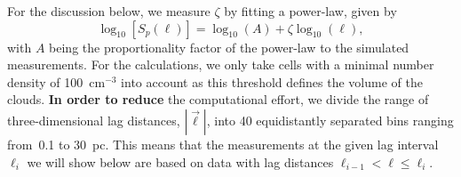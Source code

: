 For the discussion below, we measure $\zeta$ by fitting a power-law, given by
\begin{equation}
	\log_{10}\left[ S_p(\ell) \right] = \log_{10}\left(A\right) + \zeta \log_{10}(\ell) ,
    \label{equ:method:fitting}
\end{equation}
with $A$ being the proportionality factor of the power-law to the simulated measurements.
For the calculations, we only take cells with a minimal number density of 100~cm$^{-3}$ into account as this threshold defines the volume of the clouds.
\textbf{In order to reduce} the computational effort, we divide the range of three-dimensional lag distances, $|\vec{\ell}|$, into 40 equidistantly separated bins ranging from~0.1 to 30~pc.
This means that the measurements at the given lag interval $\ell_i$ we will show below are based on data with lag distances $\ell_{i-1} < \ell \leq \ell_i$.


\endinput
